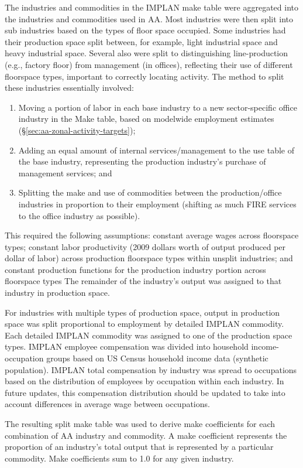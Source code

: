 The industries and commodities in the IMPLAN make table were aggregated into the industries and commodities used in AA. Most industries were then split into sub industries based on the types of floor space occupied. Some industries had their production space split between, for example, light industrial space and heavy industrial space. Several also were split to distinguishing line-production (e.g., factory floor) from management (in offices), reflecting their use of different floorspace types, important to correctly locating activity. The method to split these industries essentially involved:
\begin{enumerate}
\item Moving a portion of labor in each base industry to a new sector-specific office industry in the Make table, based on modelwide employment estimates (\S\ref{sec:aa-zonal-activity-targets});
\item Adding an equal amount of internal services/management to the use table of the base industry, representing the production industry's purchase of management services; and
\item Splitting the make and use of commodities between the production/office industries in proportion to their employment (shifting as much FIRE services to the office industry as possible).
\end{enumerate}
\noindent This required the following assumptions: constant average wages across floorspace types; constant labor productivity (2009 dollars worth of output produced per dollar of labor) across production floorspace types within unsplit industries; and constant production functions for the production industry portion across floorspace types The remainder of the industry's output was assigned to that industry in production space.

For industries with multiple types of production space, output in production space was split proportional to employment by detailed IMPLAN commodity. Each detailed IMPLAN commodity was assigned to one of the production space types. IMPLAN employee compensation was divided into household income-occupation groups based on US Census household income data (synthetic population). IMPLAN total compensation by industry was spread to occupations based on the distribution of employees by occupation within each industry. In future updates, this compensation distribution should be updated to take into account differences in average wage between occupations.

The resulting split make table was used to derive make coefficients for each combination of AA industry and commodity. A make coefficient represents the proportion of an industry's total output that is represented by a particular commodity. Make coefficients sum to 1.0 for any given industry.

